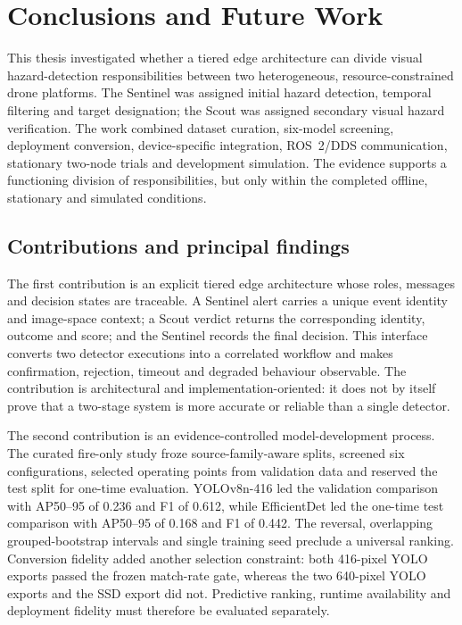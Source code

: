 \chapter{Conclusions and Future Work}
\label{ch:conclusion}

This thesis investigated whether a tiered edge architecture can divide
visual hazard-detection responsibilities between two heterogeneous,
resource-constrained drone platforms. The Sentinel was assigned initial hazard
detection, temporal filtering and target designation; the Scout was assigned
secondary visual hazard verification. The work combined dataset curation,
six-model screening, deployment conversion, device-specific integration,
ROS~2/DDS communication, stationary two-node trials and development
simulation. The evidence supports a functioning division of responsibilities,
but only within the completed offline, stationary and simulated conditions.

\section{Contributions and principal findings}
\label{sec:conclusion:1}

The first contribution is an explicit tiered edge architecture whose
roles, messages and decision states are traceable. A Sentinel alert carries a
unique event identity and image-space context; a Scout verdict returns the
corresponding identity, outcome and score; and the Sentinel records the final
decision. This interface converts two detector executions into a correlated
workflow and makes confirmation, rejection, timeout and degraded behaviour
observable. The contribution is architectural and implementation-oriented: it
does not by itself prove that a two-stage system is more accurate or reliable
than a single detector.

The second contribution is an evidence-controlled model-development process.
The curated fire-only study froze source-family-aware splits, screened six
configurations, selected operating points from validation data and reserved the
test split for one-time evaluation. YOLOv8n-416 led the validation comparison
with AP50--95 of 0.236 and F1 of 0.612, while EfficientDet led the one-time test
comparison with AP50--95 of 0.168 and F1 of 0.442. The reversal, overlapping
grouped-bootstrap intervals and single training seed preclude a universal
ranking. Conversion fidelity added another selection constraint: both
416-pixel YOLO exports passed the frozen match-rate gate, whereas the two
640-pixel YOLO exports and the SSD export did not. Predictive ranking, runtime
availability and deployment fidelity must therefore be evaluated separately.

